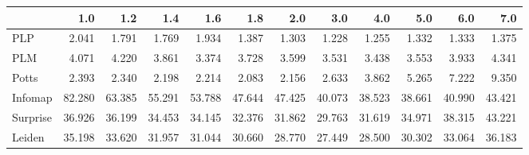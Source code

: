\begin{tabular}{lrrrrrrrrrrr}
\toprule
{} &    1.0 &    1.2 &    1.4 &    1.6 &    1.8 &    2.0 &    3.0 &    4.0 &    5.0 &    6.0 &    7.0 \\
\midrule
PLP      &  2.041 &  1.791 &  1.769 &  1.934 &  1.387 &  1.303 &  1.228 &  1.255 &  1.332 &  1.333 &  1.375 \\
PLM      &  4.071 &  4.220 &  3.861 &  3.374 &  3.728 &  3.599 &  3.531 &  3.438 &  3.553 &  3.933 &  4.341 \\
Potts    &  2.393 &  2.340 &  2.198 &  2.214 &  2.083 &  2.156 &  2.633 &  3.862 &  5.265 &  7.222 &  9.350 \\
Infomap  & 82.280 & 63.385 & 55.291 & 53.788 & 47.644 & 47.425 & 40.073 & 38.523 & 38.661 & 40.990 & 43.421 \\
Surprise & 36.926 & 36.199 & 34.453 & 34.145 & 32.376 & 31.862 & 29.763 & 31.619 & 34.971 & 38.315 & 43.221 \\
Leiden   & 35.198 & 33.620 & 31.957 & 31.044 & 30.660 & 28.770 & 27.449 & 28.500 & 30.302 & 33.064 & 36.183 \\
\bottomrule
\end{tabular}

